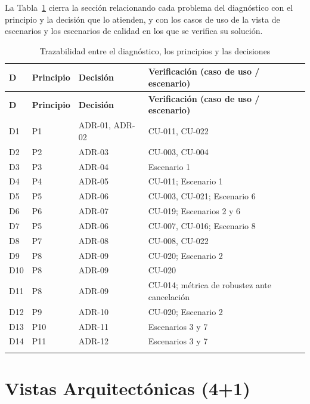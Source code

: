 \documentclass[11pt,a4paper]{article}
\DeclareRobustCommand{\_}{\textunderscore\allowbreak}
\begin{document}
La Tabla~\ref{tab:traza_diagnostico} cierra la sección relacionando cada problema del diagnóstico con el principio y la decisión que lo atienden, y con los casos de uso de la vista de escenarios y los escenarios de calidad en los que se verifica su solución.

\begin{center}
\small
\begin{longtable}{|>{\raggedright\arraybackslash}p{}|>{\raggedright\arraybackslash}p{}|>{\raggedright\arraybackslash}p{}|>{\raggedright\arraybackslash}p{}|}
\hline
\textbf{D} & \textbf{Principio} & \textbf{Decisión} & \textbf{Verificación (caso de uso / escenario)} \\
\hline
\endfirsthead
\hline
\textbf{D} & \textbf{Principio} & \textbf{Decisión} & \textbf{Verificación (caso de uso / escenario)} \\
\hline
\endhead
D1 & P1 & ADR-01, ADR-02 & CU-011, CU-022 \\
\hline
D2 & P2 & ADR-03 & CU-003, CU-004 \\
\hline
D3 & P3 & ADR-04 & Escenario 1 \\
\hline
D4 & P4 & ADR-05 & CU-011; Escenario 1 \\
\hline
D5 & P5 & ADR-06 & CU-003, CU-021; Escenario 6 \\
\hline
D6 & P6 & ADR-07 & CU-019; Escenarios 2 y 6 \\
\hline
D7 & P5 & ADR-06 & CU-007, CU-016; Escenario 8 \\
\hline
D8 & P7 & ADR-08 & CU-008, CU-022 \\
\hline
D9 & P8 & ADR-09 & CU-020; Escenario 2 \\
\hline
D10 & P8 & ADR-09 & CU-020 \\
\hline
D11 & P8 & ADR-09 & CU-014; métrica de robustez ante cancelación \\
\hline
D12 & P9 & ADR-10 & CU-020; Escenario 2 \\
\hline
D13 & P10 & ADR-11 & Escenarios 3 y 7 \\
\hline
D14 & P11 & ADR-12 & Escenarios 3 y 7 \\
\hline
\caption{Trazabilidad entre el diagnóstico, los principios y las decisiones} \label{tab:traza_diagnostico} \\
\end{longtable}
\end{center}

\section{Vistas Arquitect\'onicas (4+1)}
\end{document}
